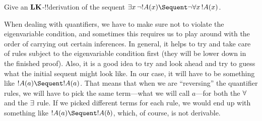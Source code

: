 \documentclass[../../../include/open-logic-section]{subfiles}
\begin{document}


\begin{ex}
Give an $\Log{LK}$-!!{derivation} of the sequent $\lexists[x][\lnot !A(x)]
\Sequent \lnot \lforall[x][!A(x)]$.

When dealing with quantifiers, we have to make sure not to violate the
eigenvariable condition, and sometimes this requires us to play around
with the order of carrying out certain inferences. In general, it
helps to try and take care of rules subject to the eigenvariable
condition first (they will be lower down in the finished proof). Also,
it is a good idea to try and look ahead and try to guess what the
initial sequent might look like. In our case, it will have to be
something like $!A(a) \Sequent !A(a)$. That means that when we are
``reversing'' the quantifier rules, we will have to pick the same
term---what we will call $a$---for both the $\lforall$ and the
$\lexists$ rule. If we picked different terms for each rule, we would
end up with something like $!A(a) \Sequent !A(b)$, which, of course,
is not derivable.


\end{ex}
\end{document}

